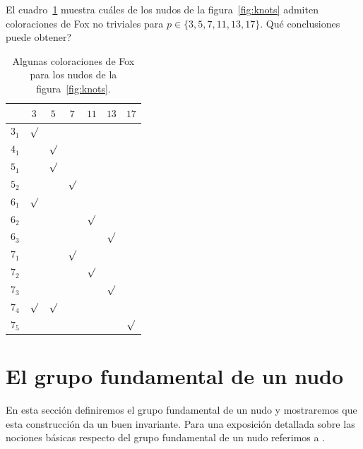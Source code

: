 \documentclass[graybox]{svmult}
\begin{document}
\begin{exercise}
    \label{exercise:colorings}
    El cuadro~\ref{tab:colorings} muestra cuáles de los nudos de la
    figura~\ref{fig:knots} admiten coloraciones de Fox no triviales para
    $p\in\{3,5,7,11,13,17\}$. \textquestiondown Qué conclusiones puede obtener? 

        \begin{table}[h]
		\centering
        \begin{tabular}{|c|c|c|c|c|c|c|}
            \hline 
            & $3$ & $5$ & $7$ & $11$ & $13$ & $17$\tabularnewline
            \hline 
            $3_{1}$ & $\surd$ &  &  &  &  & \tabularnewline
            \hline 
            $4_{1}$ &  & $\surd$ &  &  &  & \tabularnewline
            \hline 
            $5_{1}$ &  & $\surd$ &  &  &  & \tabularnewline
            \hline 
            $5_{2}$ &  &  & $\surd$ &  &  & \tabularnewline
            \hline 
            $6_{1}$ & $\surd$ &  &  &  &  & \tabularnewline
            \hline 
            $6_{2}$ &  &  &  & $\surd$ &  & \tabularnewline
            \hline 
            $6_{3}$ &  &  &  &  & $\surd$ & \tabularnewline
            \hline 
            $7_{1}$ &  &  & $\surd$ &  &  & \tabularnewline
            \hline 
            $7_{2}$ &  &  &  & $\surd$ &  & \tabularnewline
            \hline 
            $7_{3}$ &  &  &  &  & $\surd$ & \tabularnewline
            \hline 
            $7_{4}$ & $\surd$ & $\surd$ &  &  &  & \tabularnewline
            \hline 
            $7_{5}$ &  &  &  &  &  & $\surd$\tabularnewline
            \hline 
        \end{tabular}
        \caption{Algunas coloraciones de Fox para los nudos de la figura~\ref{fig:knots}.}
        \label{tab:colorings}
    \end{table}
\end{exercise}

\section{El grupo fundamental de un nudo}
\label{section:pi_1}

En esta sección definiremos el grupo fundamental de un nudo y mostraremos que
esta construcción da un buen invariante. Para una exposición detallada sobre
las nociones básicas respecto del grupo fundamental de un nudo referimos a
\cite{MR0445489}.
\end{document}
